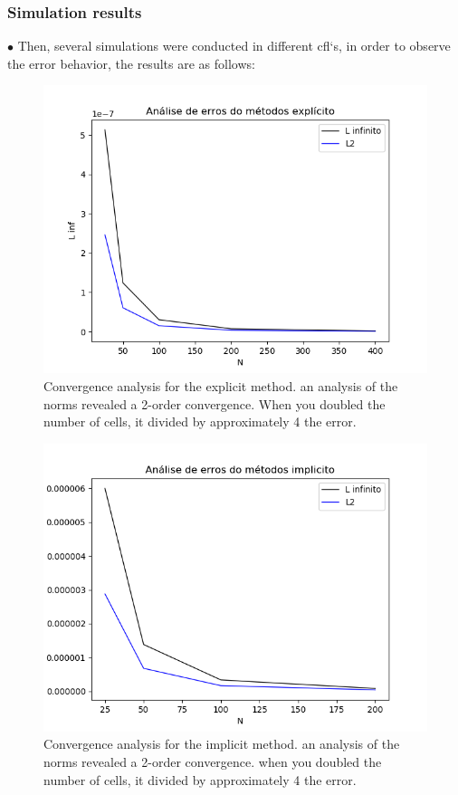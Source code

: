 \documentclass[xcolor=dvipsnames,10pt,aspectratio=169]{beamer}
\begin{document}
\begin{frame}
	\frametitle{Simulation results}
	$\bullet$ Then, several simulations were conducted in different cfl`s, in order to observe the error behavior, the results are as follows: \\
	\begin{minipage}[h!]{0.49\textwidth}
		\begin{figure}[h!]
			\centering
			\includegraphics[trim = {0cm 0cm 0cm 0cm}, clip , angle=0, scale=0.4]{figuras/analise_de_erros_explicito}
			\caption{Convergence analysis for the explicit method. an analysis of the norms revealed a 2-order convergence. When you doubled the number of cells, it divided by approximately 4 the error.}
		\end{figure}
	\end{minipage}
	\begin{minipage}[h!]{0.49\textwidth}
		\begin{figure}[h!]
			\centering
			\includegraphics[trim = {0cm 0cm 0cm 0cm}, clip , angle=0, scale=0.4]{figuras/analise_de_erros_implicito}
			\caption{Convergence analysis for the implicit method. an analysis of the norms revealed a 2-order convergence. when you doubled the number of cells, it divided by approximately 4 the error.}
		\end{figure}
	\end{minipage}
\end{frame}
\end{document}
